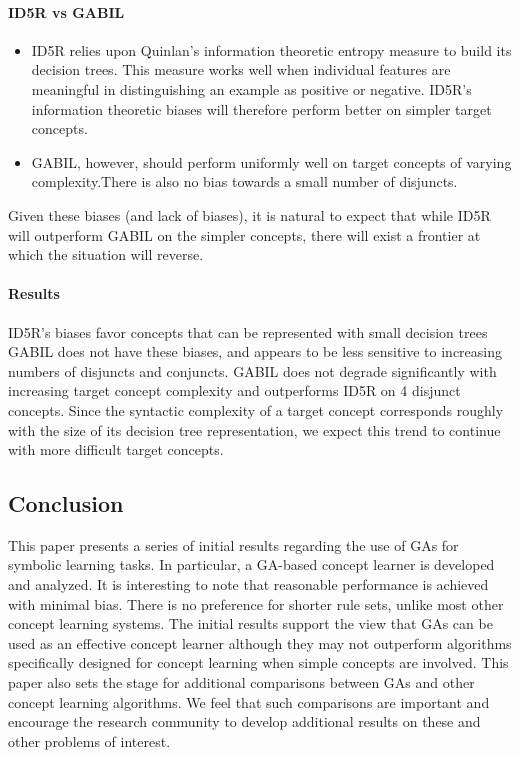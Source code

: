 \documentclass[../main.tex]{subfiles}
\begin{document}
\paragraph{ID5R vs GABIL}

\begin{itemize}
	\item ID5R relies upon Quinlan’s information theoretic entropy measure to build its decision trees. This measure
	works well when individual features are meaningful in distinguishing an example as positive or negative.  ID5R’s
	information theoretic biases will therefore perform better on simpler target concepts.
	\item GABIL, however, should perform uniformly well on target concepts of varying complexity.There is also no bias
	towards a small number of disjuncts.
\end{itemize}

Given these biases (and lack of biases), it is natural to expect that while ID5R will outperform GABIL on the simpler
concepts, there will exist a frontier at which the situation will reverse.

\paragraph{Results}

ID5R’s biases favor concepts that can be represented with small decision trees GABIL does not have these biases, and
appears to be less sensitive to increasing numbers of disjuncts and conjuncts. GABIL does not degrade significantly
with increasing target concept complexity and outperforms ID5R on 4 disjunct concepts. Since the syntactic complexity
of a target concept corresponds roughly with the size of its decision tree representation, we expect this trend to
continue with more difficult target concepts.

\subsection{Conclusion}
This paper presents a series of initial results regarding the use of GAs for symbolic learning tasks. In particular, a
GA-based concept learner is developed and analyzed. It is interesting to note that reasonable performance is achieved
with minimal bias. There is no preference for shorter rule sets, unlike most other concept learning systems. The
initial results support the view that GAs can be used as an effective concept learner although they may not outperform
algorithms specifically designed for concept learning when simple concepts are involved. This paper also sets the stage
for additional comparisons between GAs and other concept learning algorithms. We feel that such comparisons are
important and encourage the research community to develop additional results on these and other problems of interest.
\end{document}
